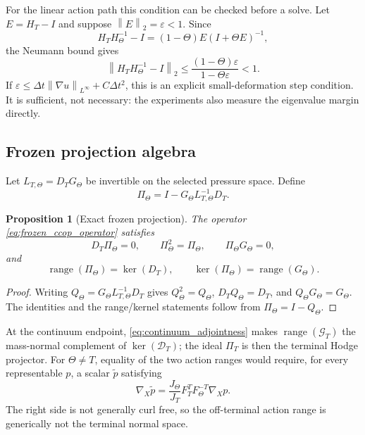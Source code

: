 \documentclass[11pt]{article}
\theoremstyle{plain}
\newtheorem{proposition}[theorem]{Proposition}
\theoremstyle{definition}
\theoremstyle{remark}
\newcommand{\D}{\mathcal{D}}
\newcommand{\G}{\mathcal{G}}
\newcommand{\range}{\operatorname{range}}
\newcommand{\kernel}{\operatorname{ker}}
\newcommand{\dt}{\Delta t}
\newcommand{\Th}{\Theta}
\newcommand{\norm}[2][]{\left\lVert #2\right\rVert_{#1}}
\begin{document}
For the linear action path this condition can be checked before a solve.  Let
$E=H_T-I$ and suppose $\norm[2]{E}=\varepsilon<1$.  Since
\begin{equation}
 H_TH_\Th^{-1}-I
 =(1-\Th)E(I+\Th E)^{-1},
 \label{eq:relative_path_exact_identity}
\end{equation}
the Neumann bound gives
\begin{equation}
 \norm[2]{H_TH_\Th^{-1}-I}
 \le \frac{(1-\Th)\varepsilon}{1-\Th\varepsilon}<1.
 \label{eq:relative_path_explicit_bound}
\end{equation}
If $\varepsilon\le \dt\norm[L^\infty]{\nabla u}+C\dt^2$, this is an explicit
small-deformation step condition.  It is sufficient, not necessary: the
experiments also measure the eigenvalue margin directly.

\subsection{Frozen projection algebra}

Let $L_{T,\Th}=D_TG_\Th$ be invertible on the selected pressure space.  Define
\begin{equation}
  \Pi_\Th=I-G_\Th L_{T,\Th}^{-1}D_T.
  \label{eq:frozen_ccop_operator}
\end{equation}

\begin{proposition}[Exact frozen projection]
\label{prop:frozen_projection}
The operator \eqref{eq:frozen_ccop_operator} satisfies
\begin{equation}
 D_T\Pi_\Th=0,
 \qquad
 \Pi_\Th^2=\Pi_\Th,
 \qquad
 \Pi_\Th G_\Th=0,
 \label{eq:frozen_projection_identities}
\end{equation}
and
\begin{equation}
 \range(\Pi_\Th)=\kernel(D_T),
 \qquad
 \kernel(\Pi_\Th)=\range(G_\Th).
 \label{eq:frozen_projection_spaces}
\end{equation}
\end{proposition}

\begin{proof}
Writing $Q_\Th=G_\Th L_{T,\Th}^{-1}D_T$ gives
$Q_\Th^2=Q_\Th$, $D_TQ_\Th=D_T$, and
$Q_\Th G_\Th=G_\Th$.  The identities and the range/kernel statements follow
from $\Pi_\Th=I-Q_\Th$.
\end{proof}

At the continuum endpoint, \eqref{eq:continuum_adjointness} makes
$\range(\G_T)$ the mass-normal complement of $\kernel(\D_T)$; the ideal
$\Pi_T$ is then the terminal Hodge projector.  For $\Th\ne T$, equality of the
two action ranges would require, for every representable $p$, a scalar
$\widetilde p$ satisfying
\begin{equation}
 \nabla_X\widetilde p
 =\frac{J_\Th}{J_T}F_T^TF_\Th^{-T}\nabla_Xp.
 \label{eq:off_terminal_integrability}
\end{equation}
The right side is not generally curl free, so the off-terminal action range is
generically not the terminal normal space.
\end{document}
